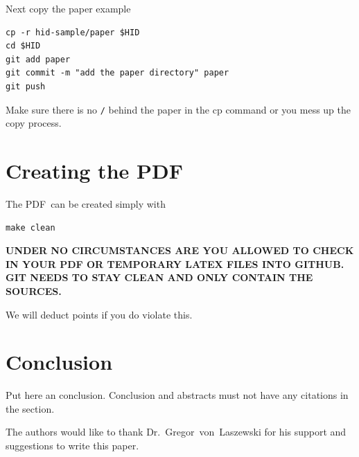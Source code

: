 Next copy the paper example

\begin{verbatim}
cp -r hid-sample/paper $HID
cd $HID
git add paper
git commit -m "add the paper directory" paper
git push
\end{verbatim}

Make sure there is no \verb|/| behind the paper in the cp command or you mess up the
copy process.


\section{Creating the PDF}

The PDF\ can be created simply with 

\begin{verbatim}
make clean
\end{verbatim}



{\bf UNDER NO CIRCUMSTANCES ARE YOU ALLOWED TO CHECK IN YOUR PDF OR
  TEMPORARY LATEX FILES INTO GITHUB. GIT NEEDS TO STAY CLEAN AND ONLY
  CONTAIN THE SOURCES.}

We will deduct points if you do violate this.

\section{Conclusion}

Put here an conclusion. Conclusion and abstracts must not have any
citations in the section.


\begin{acks}

  The authors would like to thank Dr.~Gregor~von~Laszewski for his
  support and suggestions to write this paper.

\end{acks}


 

